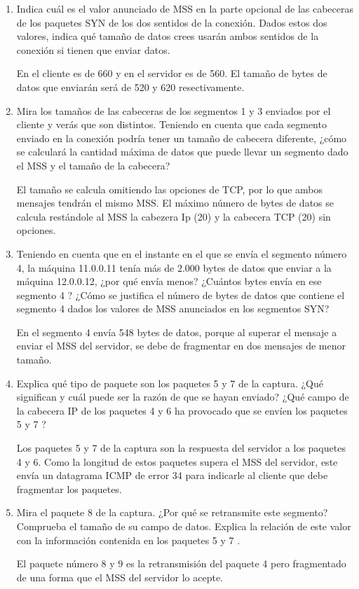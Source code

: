 \documentclass[12pt, a4paper]{report}
\begin{document}
\begin{enumerate}
	\item Indica cuál es el valor anunciado de MSS en la parte opcional de las cabeceras de los paquetes SYN de los dos sentidos de la conexión. Dados estos dos valores, indica qué tamaño de datos crees usarán ambos sentidos de la conexión si tienen que enviar datos.
	
	En el cliente es de 660 y en el servidor es de 560. El tamaño de bytes de datos que enviarán será de 520 y 620 resectivamente.
	
	\item Mira los tamaños de las cabeceras de los segmentos 1 y 3 enviados por el cliente y verás que son distintos. Teniendo en cuenta que cada segmento enviado en la conexión podría tener un tamaño de cabecera diferente, ¿cómo se calculará la cantidad máxima de datos que puede llevar un segmento dado el MSS y el tamaño de la cabecera?
	
	El tamaño se calcula omitiendo las opciones de TCP, por lo que ambos mensajes tendrán el mismo MSS. El máximo número de bytes de datos se calcula restándole al MSS la cabezera Ip (20) y la cabecera TCP (20) sin opciones.
	
	\item Teniendo en cuenta que en el instante en el que se envía el segmento número 4, la máquina 11.0.0.11 tenía más de $2.000$ bytes de datos que enviar a la máquina 12.0.0.12, ¿por qué envía menos? ¿Cuántos bytes envía en ese segmento 4 ? ¿Cómo se justifica el número de bytes de datos que contiene el segmento 4 dados los valores de MSS anunciados en los segmentos SYN?
	
	En el segmento 4 envía 548 bytes de datos, porque al superar el mensaje a enviar el MSS del servidor, se debe de fragmentar en dos mensajes de menor tamaño.
	
	\item Explica qué tipo de paquete son los paquetes 5 y 7 de la captura. ¿Qué significan y cuál puede ser la razón de que se hayan enviado? ¿Qué campo de la cabecera IP de los paquetes 4 y 6 ha provocado que se envíen los paquetes 5 y 7 ?
	
	Los paquetes 5 y 7 de la captura son la respuesta del servidor a los paquetes 4 y 6. Como la longitud de estos paquetes supera el MSS del servidor, este envía un datagrama ICMP de error 34 para indicarle al cliente que debe fragmentar los paquetes.
	
	\item Mira el paquete 8 de la captura. ¿Por qué se retransmite este segmento? Comprueba el tamaño de su campo de datos. Explica la relación de este valor con la información contenida en los paquetes 5 y 7 .
	
	El paquete número 8 y 9 es la retransmisión del paquete 4 pero fragmentado de una forma que el MSS del servidor lo acepte.
	
\end{enumerate}
\end{document}
